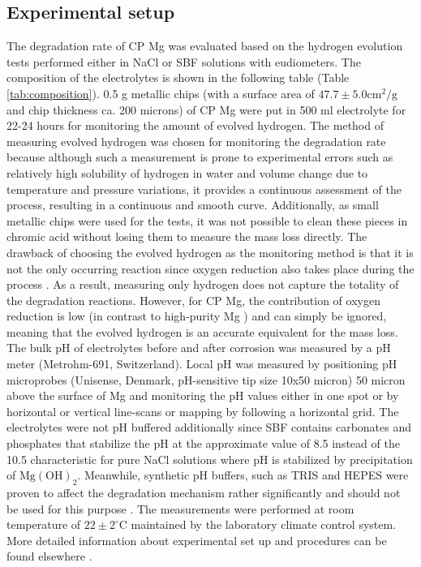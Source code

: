 \subsection{Experimental setup}

The degradation rate of \gls{CP} Mg was evaluated based on the hydrogen evolution tests  performed either in  NaCl or \gls{SBF} solutions with eudiometers. The composition of the electrolytes is  shown in the following table (Table \ref{tab:composition}). 0.5 g metallic chips (with a surface area of $47.7\pm5.0 \mathrm{cm}^2/\mathrm{g}$ and chip thickness ca. 200 microns) of \gls{CP} Mg were put in 500 ml electrolyte for 22-24 hours for monitoring the amount of evolved hydrogen. The method of measuring evolved hydrogen was chosen for monitoring the degradation rate because although such a measurement is prone to experimental errors such as relatively high solubility of hydrogen in water and volume change due to temperature and pressure variations, it provides a continuous assessment of the process, resulting in a continuous and smooth curve. Additionally, as small metallic chips were used for the tests, it was not possible to clean these pieces in chromic acid without losing them to measure the mass loss directly. The drawback of choosing the evolved hydrogen as the monitoring method is that it is not the only occurring reaction since oxygen reduction also takes place during the process \cite{Wang2020,Strebl2020,Silva2018}. As a result,  measuring only hydrogen does not capture the totality of the degradation reactions. However, for \gls{CP} Mg, the contribution of oxygen reduction is low (in contrast to high-purity Mg \cite{Wang2020}) and can simply be ignored, meaning that the evolved hydrogen is an accurate equivalent for the mass loss. The bulk pH of electrolytes before and after corrosion was measured by a pH meter (Metrohm-691, Switzerland). Local pH was measured by positioning pH microprobes (Unisense, Denmark, pH-sensitive tip size 10x50 micron) 50 micron above the surface of Mg and monitoring the pH values either in one spot or by horizontal or vertical line-scans or mapping by following a horizontal grid. The electrolytes were not pH buffered additionally since \gls{SBF} contains carbonates and phosphates that stabilize the pH at the approximate value of 8.5 instead of the 10.5 characteristic for pure NaCl solutions where pH is stabilized by precipitation of $\mathrm{Mg}(\mathrm{OH})_{2}$.  Meanwhile, synthetic pH buffers, such as TRIS and HEPES were proven to affect the degradation mechanism rather significantly and should not be used for this purpose \cite{Mei2020}. The measurements were performed at room temperature of $22\pm2^{\circ}\mathrm{C}$ maintained by the laboratory climate control system. More detailed information about experimental set up and procedures  can be found  elsewhere \cite{Mei2019,Mei2019a}.



